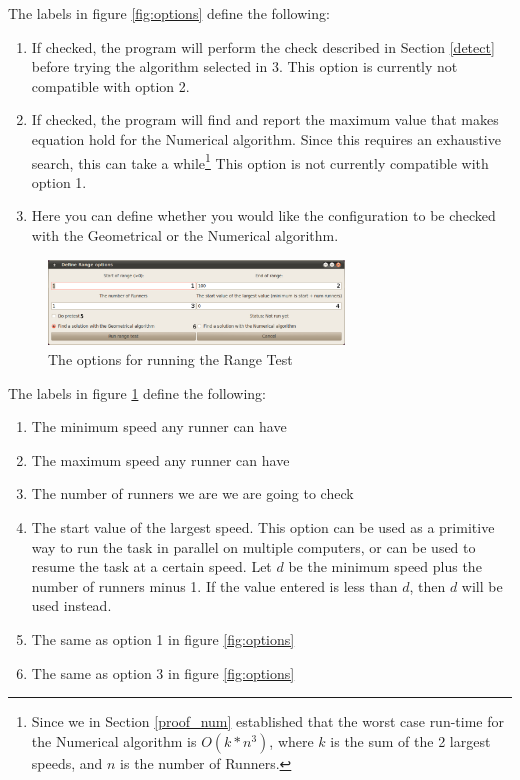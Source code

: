 The labels in figure \ref{fig:options} define the following:
\begin{enumerate}
\item If checked, the program will perform the check described in Section \ref{detect} before trying the algorithm selected in 3. This option is currently not compatible with option 2.
\item If checked, the program will find and report the maximum value that makes equation  hold for the Numerical algorithm. Since this requires an exhaustive search, this can take a while\footnote{Since we in Section \ref{proof_num} established that the worst case run-time for the Numerical algorithm is $O(k * n^3)$, where $k$ is the sum of the 2 largest speeds, and $n$ is the number of Runners.} This option is not currently compatible with option 1.
\item Here you can define whether you would like the configuration to be checked with the Geometrical or the Numerical algorithm.
\end{enumerate}

\begin{figure}[H]
  \centering
  \includegraphics[width=0.70\textwidth]{./images/Range_Options}
  \caption{\label{fig:range_options}The options for running the Range Test}
\end{figure}

The labels in figure \ref{fig:range_options} define the following:
\begin{enumerate}
\item The minimum speed any runner can have 
\item The maximum speed any runner can have
\item The number of runners we are we are going to check
\item The start value of the largest speed. This option can be used as a primitive way to run the task in parallel on multiple computers, or can be used to resume the task at a certain speed. Let $d$ be the minimum speed plus the number of runners minus 1. If the value entered is less than $d$, then $d$ will be used instead.
\item The same as option 1 in figure \ref{fig:options}
\item The same as option 3 in figure \ref{fig:options}
\end{enumerate}

